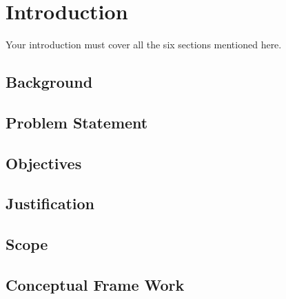 \chapter{Introduction}
\label{cha:Introduction}      %
Your introduction must cover all the six sections mentioned here.

\section{Background}
\lipsum
\section{Problem Statement}
\lipsum
\section{Objectives}
\lipsum
\section{Justification}
\lipsum
\section{Scope}
\lipsum
\section{Conceptual Frame Work}
\lipsum